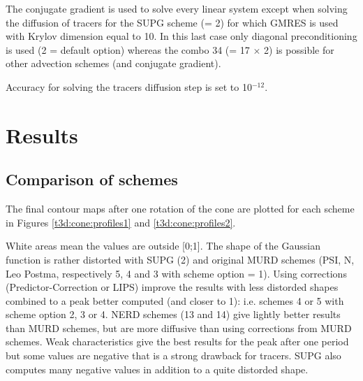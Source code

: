 The conjugate gradient is used to solve every linear system except when solving
the diffusion of tracers for the SUPG scheme (= 2) for which GMRES is used
with Krylov dimension equal to 10.
In this last case only diagonal preconditioning is used (2 = default option)
whereas the combo 34 (= 17 $\times$ 2) is possible for other advection schemes
(and conjugate gradient).

Accuracy for solving the tracers diffusion step is set to 10$^{-12}$.

\section{Results}

\subsection{Comparison of schemes}

The final contour maps after one rotation of the cone are plotted for each
scheme in Figures \ref{t3d:cone:profiles1} and \ref{t3d:cone:profiles2}.

White areas mean the values are outside [0;1].
The shape of the Gaussian function is rather distorted with SUPG (2) and original
MURD schemes (PSI, N, Leo Postma, respectively 5, 4 and 3 with scheme option = 1).
Using corrections (Predictor-Correction or LIPS) improve the results with less
distorded shapes combined to a peak better computed (and closer to 1):
i.e. schemes 4 or 5 with scheme option 2, 3 or 4.
NERD schemes (13 and 14) give lightly better results than MURD schemes,
but are more diffusive than using corrections from MURD schemes.
Weak characteristics give the best results for the peak after one period
but some values are negative that is a strong drawback for tracers.
SUPG also computes many negative values in addition to a quite distorded shape.


